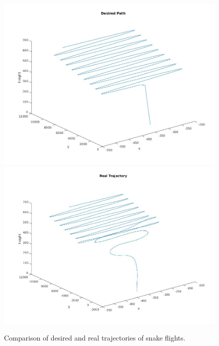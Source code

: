 \documentclass[11pt,a4paper]{scrartcl}		%
\begin{document}
\begin{figure}[!h]
  \centering
  	\includegraphics[width=13cm]{pictures/Results/snake-desired.jpg}
  	\includegraphics[width=13cm]{pictures/Results/snake-real.jpg}
  \caption{Comparison of desired and real trajectories of snake flights.}
  \label{fig_snake}
\end{figure}			
\end{document}
